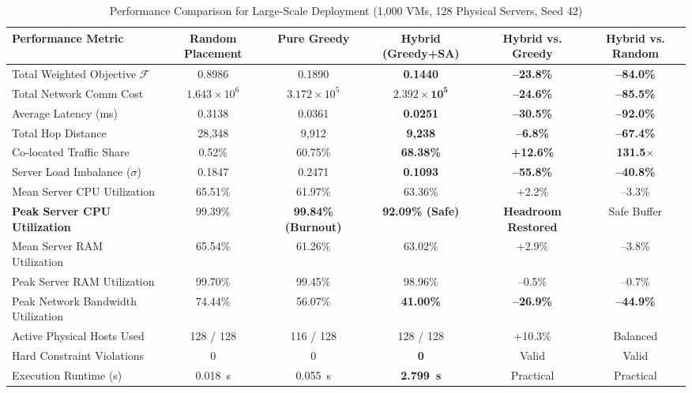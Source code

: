 \documentclass[conference]{IEEEtran}
\begin{document}
\begin{table}[t]
\centering
\caption{Performance Comparison for Large-Scale Deployment (1,000 VMs, 128 Physical Servers, Seed 42)}
\label{tab:large_scale}
\begin{tabular}{lccccc}
\toprule
\textbf{Performance Metric} & \textbf{Random Placement} & \textbf{Pure Greedy} & \textbf{Hybrid (Greedy+SA)} & \textbf{Hybrid vs. Greedy} & \textbf{Hybrid vs. Random} \\
\midrule
Total Weighted Objective $\mathcal{F}$ & 0.8986 & 0.1890 & \textbf{0.1440} & \textbf{--23.8\%} & \textbf{--84.0\%} \\
Total Network Comm Cost & $1.643 \times 10^6$ & $3.172 \times 10^5$ & $\mathbf{2.392 \times 10^5}$ & \textbf{--24.6\%} & \textbf{--85.5\%} \\
Average Latency (ms) & 0.3138 & 0.0361 & \textbf{0.0251} & \textbf{--30.5\%} & \textbf{--92.0\%} \\
Total Hop Distance & 28,348 & 9,912 & \textbf{9,238} & \textbf{--6.8\%} & \textbf{--67.4\%} \\
Co-located Traffic Share & 0.52\% & 60.75\% & \textbf{68.38\%} & \textbf{+12.6\%} & \textbf{131.5$\times$} \\
Server Load Imbalance ($\sigma$) & 0.1847 & 0.2471 & \textbf{0.1093} & \textbf{--55.8\%} & \textbf{--40.8\%} \\
Mean Server CPU Utilization & 65.51\% & 61.97\% & 63.36\% & +2.2\% & --3.3\% \\
\textbf{Peak Server CPU Utilization} & 99.39\% & \textbf{99.84\% (Burnout)} & \textbf{92.09\% (Safe)} & \textbf{Headroom Restored} & Safe Buffer \\
Mean Server RAM Utilization & 65.54\% & 61.26\% & 63.02\% & +2.9\% & --3.8\% \\
Peak Server RAM Utilization & 99.70\% & 99.45\% & 98.96\% & --0.5\% & --0.7\% \\
Peak Network Bandwidth Utilization & 74.44\% & 56.07\% & \textbf{41.00\%} & \textbf{--26.9\%} & \textbf{--44.9\%} \\
Active Physical Hosts Used & 128 / 128 & 116 / 128 & 128 / 128 & +10.3\% & Balanced \\
Hard Constraint Violations & 0 & 0 & \textbf{0} & Valid & Valid \\
Execution Runtime (s) & 0.018~s & 0.055~s & \textbf{2.799~s} & Practical & Practical \\
\bottomrule
\end{tabular}
\end{table}
\end{document}

